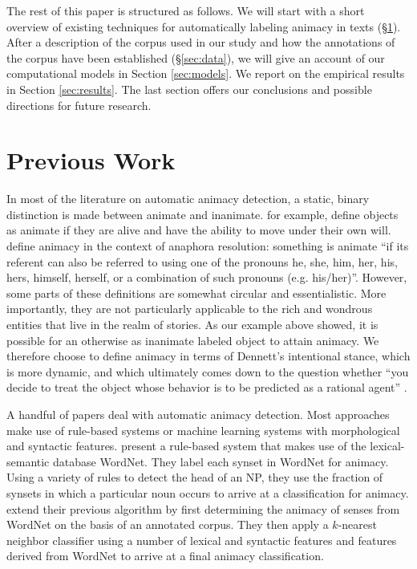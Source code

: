 \documentclass[a4paper,UKenglish]{oasics}
\begin{document}
The rest of this paper is structured as follows. We will start with a
short overview of existing techniques for automatically labeling
animacy in texts (\S\ref{sec:previous-work}). After a description of
the corpus used in our study and how the annotations of the corpus
have been established (\S\ref{sec:data}), we will give an account of
our computational models in Section \ref{sec:models}. We report on the
empirical results in Section \ref{sec:results}. The last section
offers our conclusions and possible directions for future research.


\section{Previous Work}\label{sec:previous-work}

In most of the literature on automatic animacy detection, a static,
binary distinction is made between animate and
inanimate. \cite{bowman:12} for example, define objects as animate if
they are alive and have the ability to move under their own
will. \cite{orasan:07} define animacy in the context of anaphora
resolution: something is animate ``if its referent can also be
referred to using one of the pronouns he, she, him, her, his, hers,
himself, herself, or a combination of such pronouns
(e.g. his/her)''. However, some parts of these definitions are
somewhat circular and essentialistic. More importantly, they are not
particularly applicable to the rich and wondrous entities that live in
the realm of stories. As our example above showed, it is possible for
an otherwise as inanimate labeled object to attain animacy. We
therefore choose to define animacy in terms of Dennett's intentional
stance, which is more dynamic, and which ultimately comes down to the
question whether ``you decide to treat the object whose behavior is to
be predicted as a rational agent'' \cite[pp. 17]{dennett:96}.

A handful of papers deal with automatic animacy detection. Most
approaches make use of rule-based systems or machine learning systems
with morphological and syntactic features. \cite{evans:00} present a
rule-based system that makes use of the lexical-semantic database
WordNet. They label each synset in WordNet for animacy. Using a
variety of rules to detect the head of an NP, they use the fraction of
synsets in which a particular noun occurs to arrive at a
classification for animacy. \cite{orasan:01} extend their previous
algorithm by first determining the animacy of senses from WordNet on
the basis of an annotated corpus. They then apply a $k$-nearest
neighbor classifier using a number of lexical and syntactic features
and features derived from WordNet to arrive at a final animacy
classification.
\end{document}

